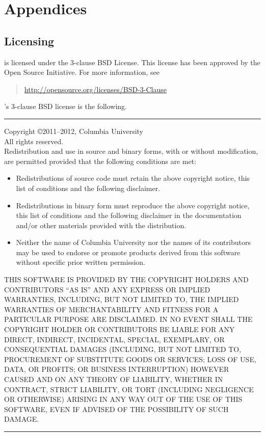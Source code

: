 
\part*{Appendices}


\chapter{Licensing}

\Stan is licensed under the 3-clause BSD License.  This license has
been approved by the Open Source Initiative.  For more information,
see
%
\begin{quote}
\url{http://opensource.org/licenses/BSD-3-Clause}
\end{quote}
%
\Stan's 3-clause BSD license is the following.
\vspace*{6pt}

\noindent
\rule{\textwidth}{1pt}

\noindent
Copyright \copyright 2011--2012, Columbia University
\\
All rights reserved.
\\[12pt]
Redistribution and use in source and binary forms, with or without
modification, are permitted provided that the following conditions are
met:

\begin{itemize}
\item Redistributions of source code must retain the above copyright
  notice, this list of conditions and the following disclaimer.
\item Redistributions in binary form must reproduce the above
  copyright notice, this list of conditions and the following
  disclaimer in the documentation and/or other materials provided with
  the distribution.
\item Neither the name of Columbia University nor the names of its
  contributors may be used to endorse or promote products derived from
  this software without specific prior written permission.
\end{itemize}

{\small \noindent
 THIS SOFTWARE IS PROVIDED BY THE COPYRIGHT HOLDERS AND
  CONTRIBUTORS ``AS IS'' AND ANY EXPRESS OR IMPLIED WARRANTIES,
  INCLUDING, BUT NOT LIMITED TO, THE IMPLIED WARRANTIES OF
  MERCHANTABILITY AND FITNESS FOR A PARTICULAR PURPOSE ARE
  DISCLAIMED. IN NO EVENT SHALL THE COPYRIGHT HOLDER OR CONTRIBUTORS
  BE LIABLE FOR ANY DIRECT, INDIRECT, INCIDENTAL, SPECIAL, EXEMPLARY,
  OR CONSEQUENTIAL DAMAGES (INCLUDING, BUT NOT LIMITED TO, PROCUREMENT
  OF SUBSTITUTE GOODS OR SERVICES; LOSS OF USE, DATA, OR PROFITS; OR
  BUSINESS INTERRUPTION) HOWEVER CAUSED AND ON ANY THEORY OF
  LIABILITY, WHETHER IN CONTRACT, STRICT LIABILITY, OR TORT (INCLUDING
  NEGLIGENCE OR OTHERWISE) ARISING IN ANY WAY OUT OF THE USE OF THIS
  SOFTWARE, EVEN IF ADVISED OF THE POSSIBILITY OF SUCH DAMAGE.
}
\noindent
\rule{\textwidth}{1pt}



